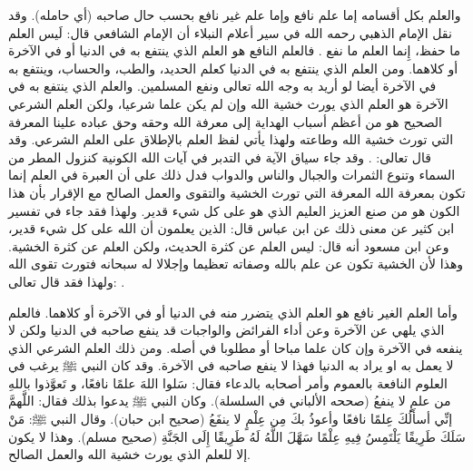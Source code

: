 والعلم بكل أقسامه إما علم نافع وإما علم غير نافع بحسب حال صاحبه (أي حامله). 
وقد نقل الإمام الذهبي رحمه الله في سير أعلام النبلاء أن الإمام الشافعي قال: لَيس العلم ما حفظ، إِنما العلم ما نفع \href{https://shamela.ws/book/22669/4503#p3}{\faExternalLink} \cite{dahabi_Siyar}. فالعلم النافع هو العلم الذي ينتفع به في الدنيا أو في الآخرة أو كلاهما. ومن العلم الذي ينتفع به في الدنيا كعلم الحديد، والطب، والحساب، وينتفع به في الآخرة أيضا لو أريد به وجه الله تعالى ونفع المسلمين. والعلم الذي ينتفع به في الآخرة هو العلم الذي يورث خشية الله وإن لم يكن علما شرعيا، ولكن العلم الشرعي الصحيح هو من أعظم أسباب الهداية إلى معرفة الله وحقه وحق عباده علينا المعرفة التي تورث خشية الله وطاعته ولهذا يأتي لفظ العلم بالإطلاق على العلم الشرعي. وقد قال تعالى: \quranayah*[35][28][8]{\footnotesize \surahname*[35]}. وقد جاء سياق الآية في التدبر في آيات الله الكونية كنزول المطر من السماء وتنوع الثمرات والجبال والناس والدواب فدل ذلك على أن العبرة في العلم إنما تكون بمعرفة الله المعرفة التي تورث الخشية والتقوى والعمل الصالح مع الإقرار بأن هذا الكون هو من صنع العزيز العليم الذي هو على كل شيء قدير. ولهذا فقد جاء في تفسير ابن كثير عن معنى ذلك عن ابن عباس قال: الذين يعلمون أن الله على كل شيء قدير، وعن ابن مسعود أنه قال: ليس العلم عن كثرة الحديث، ولكن العلم عن كثرة الخشية. وهذا لأن الخشية تكون عن علم بالله وصفاته تعظيما وإجلالا له سبحانه فتورث تقوى الله ولهذا فقد قال تعالى: \quranayah*[24][52]{\footnotesize \surahname*[24]}.

وأما العلم الغير نافع هو العلم الذي يتضرر منه في الدنيا أو في الآخرة أو كلاهما. فالعلم الذي يلهي عن الآخرة وعن أداء الفرائض والواجبات قد ينفع صاحبه في الدنيا ولكن لا ينفعه في الآخرة وإن كان علما مباحا أو مطلوبا في أصله. ومن ذلك العلم الشرعي الذي لا يعمل به او يراد به الدنيا فهذا لا ينفع صاحبه في الآخرة. وقد كان النبي ﷺ يرغب في العلوم النافعة بالعموم وأمر أصحابه بالدعاء فقال: سَلوا اللهَ علمًا نافعًا، و تَعوَّذوا باللهِ من علمٍ لا ينفعُ {\footnotesize (صححه الألباني في السلسلة)}. وكان النبي ﷺ يدعوا بذلك فقال: اللَّهمَّ إنِّي أسأَلُكَ عِلمًا نافعًا وأعوذُ بكَ مِن عِلْمٍ لا ينفَعُ {\footnotesize (صحيح ابن حبان)}. وقال النبي ﷺ: مَنْ سَلَكَ طَرِيقًا يَلْتَمِسُ فِيهِ عِلْمًا سَهَّلَ اللَّهُ لَهُ طَرِيقًا إِلَى الجَنَّةِ {\footnotesize (صحيح مسلم)}. وهذا لا يكون إلا للعلم الذي يورث خشية الله والعمل الصالح.

